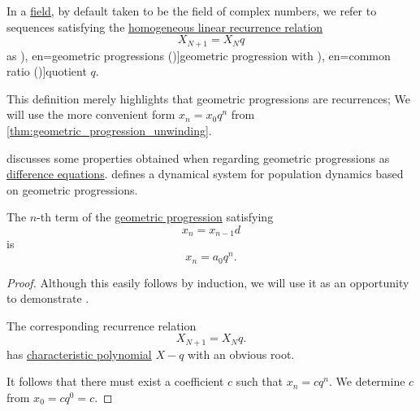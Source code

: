 \begin{definition}\label{def:geometric_progression}\mimprovised
  In a \hyperref[def:field]{field}, by default taken to be the field of complex numbers, we refer to sequences satisfying the \hyperref[def:homogeneous_linear_recurrence]{homogeneous linear recurrence relation}
  \begin{equation}\label{eq:def:geometric_progression/recurrence}
    X_{N+1} = X_N q
  \end{equation}
  as \term[ru=геометрическае прогрессии (\cite[144]{Гончаров1952ФункцииДействительногоПеременного}), en=geometric progressions (\cite[def. 2.4.2]{Rosen2019DiscreteMathematics})]{geometric progression} with \term[ru=знаменатель (прогрессии) (\cite[\S 227]{Киселёв2004Геометрия}), en=common ratio (\cite[def. 2.4.2]{Rosen2019DiscreteMathematics})]{quotient} \( q \).
\end{definition}
\begin{comments}
  \item This definition merely highlights that geometric progressions are recurrences; We will use the more convenient form \( x_n = x_0 q^n \) from \cref{thm:geometric_progression_unwinding}.

  \item {} discusses some properties obtained when regarding geometric progressions as \hyperref[def:difference_equation]{difference equations}.  defines a dynamical system for population dynamics based on geometric progressions.
\end{comments}

\begin{proposition}\label{thm:geometric_progression_unwinding}
  The \( n \)-th term of the \hyperref[def:arithmetic_progression]{geometric progression} satisfying
  \begin{equation*}
    x_n = x_{n-1} d
  \end{equation*}
  is
  \begin{equation*}
    x_n = a_0 q^n.
  \end{equation*}
\end{proposition}
\begin{proof}
  Although this easily follows by induction, we will use it as an opportunity to demonstrate .

  The corresponding recurrence relation
  \begin{equation*}
    X_{N+1} = X_N q.
  \end{equation*}
  has \hyperref[def:linear_recurrence_characteristic_polynomial]{characteristic polynomial} \( X - q \) with an obvious root.

  It follows that there must exist a coefficient \( c \) such that \( x_n = cq^n \). We determine \( c \) from \( x_0 = c q^0 = c \).
\end{proof}

